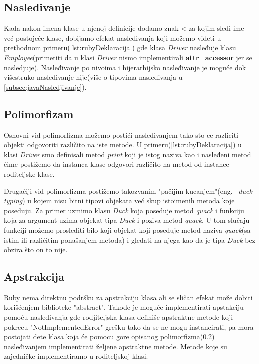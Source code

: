 \documentclass[a4paper]{article}
\begin{document}
{\subsection{Nasleđivanje}
\label{subsec:rubyNasledjivanje}
Kada nakon imena klase u njenoj definicije dodamo znak < za kojim sledi ime već postojeće klase, dobijamo efekat nasleđivanja koji možemo videti u prethodnom primeru(\ref{lst:rubyDeklaracija}) gde klasa \textit{Driver} nasleđuje klasu \textit{Employee}(primetiti da u klasi \textit{Driver} nismo implementirali \textbf{attr\_accessor} jer se nasledjuje). Nasleđivanje po nivoima i hijerarhijsko nasleđivanje je moguće dok višestruko nasleđivanje nije(više o tipovima nasleđivanja u \ref{subsec:javaNasledjivanje}).

\subsection{Polimorfizam}
\label{subsec:rubyPolimorfizam}
Osnovni vid polimorfizma možemo postići nasleđivanjem tako sto ce razliciti objekti odgovoriti različito na iste metode. U primeru(\ref{lst:rubyDeklaracija}) u klasi \textit{Driver} smo definisali metod \textit{print} koji je istog naziva kao i nasleđeni metod čime postižemo da instanca klase odgovori različito na metod od instance roditeljske klase. 

Drugačiji vid polimorfizma postižemo takozvanim "pačijim kucanjem"(eng. ~{\em duck typing}) u kojem nisu bitni tipovi objekata već skup istoimenih metoda koje poseduju. Za primer uzmimo klasu \textit{Duck} koja poseduje metod  \textit{quack} i funkciju koja za argument uzima objekat tipa \textit{Duck} i poziva metod \textit{quack}. U tom slučaju funkciji možemo proslediti bilo koji objekat koji poseduje metod naziva \textit{quack}(sa istim ili različitim ponašanjem metoda) i gledati na njega kao da je tipa \textit{Duck} bez obzira što on to nije.

\subsection{Apstrakcija}
\label{subsec:rubyApstrakcija}
Ruby nema direktnu podršku za apstrakciju klasa ali se sličan efekat može dobiti korišćenjem biblioteke "abstract". Takođe je moguće implementirati apstakciju pomoću nasleđivanja gde rodjiteljska klasa definiše apstraktne metode koji pokrecu "NotImplementedError" grešku tako da se ne mogu instancirati, pa mora postojati dete klasa koja će pomocu gore opisanog polimorfizma(\ref{subsec:rubyPolimorfizam}) nasleđivanjem implementirati željene apstraktne metode. Metode koje su zajedničke implementiramo u roditeljskoj klasi.


}
\end{document}
